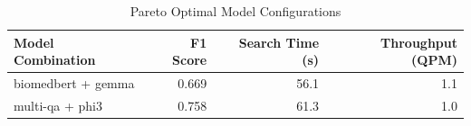 \begin{table}[H]
\caption{Pareto Optimal Model Configurations}
\label{tab:pareto_optimal}
\begin{tabular}{lrrr}
\toprule
Model Combination & F1 Score & Search Time (s) & Throughput (QPM) \\
\midrule
biomedbert + gemma & 0.669 & 56.1 & 1.1 \\
multi-qa + phi3 & 0.758 & 61.3 & 1.0 \\
\bottomrule
\end{tabular}
\end{table}